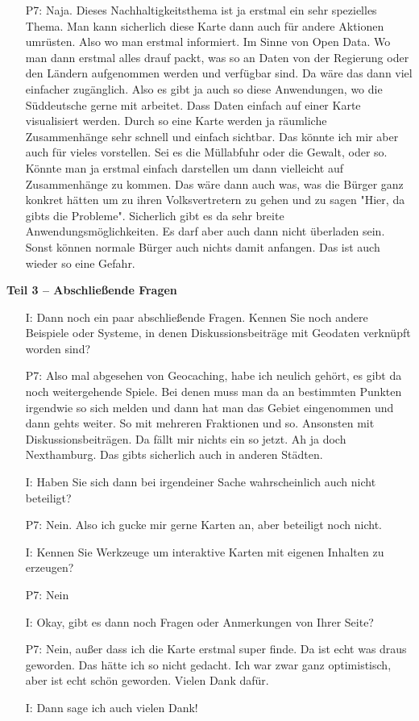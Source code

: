 \begin{itemize}
    \item[P7:] Naja. Dieses Nachhaltigkeitsthema ist ja erstmal ein sehr spezielles Thema. Man kann sicherlich diese Karte dann auch f{\"u}r andere Aktionen umr{\"u}sten. Also wo man erstmal informiert. Im Sinne von Open Data. Wo man dann erstmal alles drauf packt, was so an Daten von der Regierung oder den L{\"a}ndern aufgenommen werden und verf{\"u}gbar sind. Da w{\"a}re das dann viel einfacher zug{\"a}nglich. Also es gibt ja auch so diese Anwendungen, wo die S{\"u}ddeutsche gerne mit arbeitet. Dass Daten einfach auf einer Karte visualisiert werden. Durch so eine Karte werden ja r{\"a}umliche Zusammenh{\"a}nge sehr schnell und einfach sichtbar. Das k{\"o}nnte ich mir aber auch f{\"u}r vieles vorstellen. Sei es die M{\"u}llabfuhr oder die Gewalt, oder so. K{\"o}nnte man ja erstmal einfach darstellen um dann vielleicht auf Zusammenh{\"a}nge zu kommen. Das w{\"a}re dann auch was, was die B{\"u}rger ganz konkret h{\"a}tten um zu ihren Volksvertretern zu gehen und zu sagen "Hier, da gibts die Probleme". Sicherlich gibt es da sehr breite Anwendungsm{\"o}glichkeiten. Es darf aber auch dann nicht {\"u}berladen sein. Sonst k{\"o}nnen normale B{\"u}rger auch nichts damit anfangen. Das ist auch wieder so eine Gefahr.
\end{itemize}

\textbf{Teil 3 -- Abschlie{\ss}ende Fragen}
\begin{itemize}
    \item[I:] Dann noch ein paar abschlie{\ss}ende Fragen. Kennen Sie noch andere Beispiele oder Systeme, in denen Diskussionsbeitr{\"a}ge mit Geodaten verkn{\"u}pft worden sind?
    \item[P7:] Also mal abgesehen von Geocaching, habe ich neulich geh{\"o}rt, es gibt da noch weitergehende Spiele. Bei denen muss man da an bestimmten Punkten irgendwie so sich melden und dann hat man das Gebiet eingenommen und dann gehts weiter. So mit mehreren Fraktionen und so. Ansonsten mit Diskussionsbeitr{\"a}gen. Da f{\"a}llt mir nichts ein so jetzt. Ah ja doch Nexthamburg. Das gibts sicherlich auch in anderen St{\"a}dten.
    \item[I:] Haben Sie sich dann bei irgendeiner Sache wahrscheinlich auch nicht beteiligt?
    \item[P7:] Nein. Also ich gucke mir gerne Karten an, aber beteiligt noch nicht.
    \item[I:] Kennen Sie Werkzeuge um interaktive Karten mit eigenen Inhalten zu erzeugen?
    \item[P7:] Nein
    \item[I:] Okay, gibt es dann noch Fragen oder Anmerkungen von Ihrer Seite? 
    \item[P7:] Nein, au{\ss}er dass ich die Karte erstmal super finde. Da ist echt was draus geworden. Das h{\"a}tte ich so nicht gedacht. Ich war zwar ganz optimistisch, aber ist echt sch{\"o}n geworden. Vielen Dank daf{\"u}r.
    \item[I:] Dann sage ich auch vielen Dank!
\end{itemize}